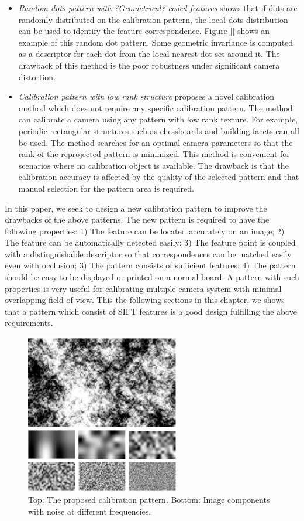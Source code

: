 \documentclass{report}
\begin{document}
\begin{itemize}
	\item \textit{Random dots pattern with ?Geometrical? coded features} \cite{oyamadasingle} shows that if dots are randomly distributed on the calibration pattern, the local dots distribution can be used to identify the feature correspondence. Figure \ref{} shows an example of this random dot pattern. Some geometric invariance is computed as a descriptor for each dot from the local nearest dot set around it. The drawback of this method is the poor robustness under significant camera distortion. 
	\item \textit{Calibration pattern with low rank structure} \cite{} proposes a novel calibration method which does not require any specific calibration pattern. The method can calibrate a camera using any pattern with low rank texture. For example, periodic rectangular structures such as chessboards and building facets can all be used. The method searches for an optimal camera parameters so that the rank of the reprojected pattern is minimized. This method is convenient for scenarios where no calibration object is available. The drawback is that the calibration accuracy is affected by the quality of the selected pattern and that manual selection for the pattern area is required. 
\end{itemize}

In this paper, we seek to design a new calibration pattern to improve the drawbacks of the above patterns. The new pattern is required to have the following properties: 1) The feature can be located accurately on an image; 2) The feature can be automatically detected easily; 3) The feature point is coupled with a distinguishable descriptor so that correspondences can be matched easily even with occlusion; 3) The pattern consists of sufficient features; 4) The pattern should be easy to be displayed or printed on a normal board. A pattern with such properties is very useful for calibrating multiple-camera system with minimal overlapping field of view. This the following sections in this chapter, we shows that a pattern which consist of SIFT features \cite{lowe2004distinctive} is a good design fulfilling the above requirements. 


\begin{figure}
\centering
\includegraphics[width=0.6\textwidth]{images/patternsample}
\caption{Top: The proposed calibration pattern. Bottom: Image components with noise at different frequencies.}
\label{PatternFig}
\end{figure}
\end{document}
